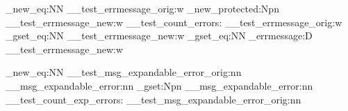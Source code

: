 \cs_new_eq:NN \__test_errmessage_orig:w \errmessage
\cs_new_protected:Npn \__test_errmessage_new:w
  {
    \__test_count_errors:
    \__test_errmessage_orig:w
  }
\cs_gset_eq:NN \errmessage       \__test_errmessage_new:w
\cs_gset_eq:NN \tex_errmessage:D \__test_errmessage_new:w %

\cs_new_eq:NN \__test_msg_expandable_error_orig:nn
              \__msg_expandable_error:nn
\cs_gset:Npn \__msg_expandable_error:nn
  {
    \__test_count_exp_errors:
    \__test_msg_expandable_error_orig:nn
  }
